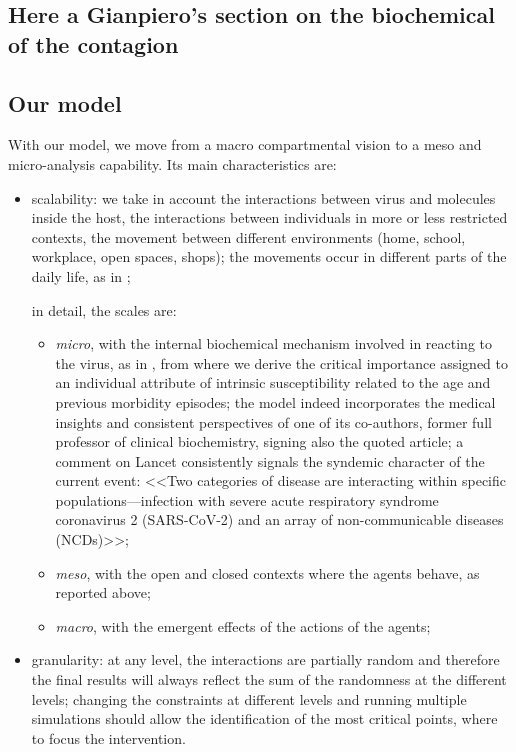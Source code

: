 \documentclass[graybox]{svmult}
\begin{document}
\subsection{Here a Gianpiero's section on the biochemical of the contagion}
\label{biochem}


\subsection{Our model}
\label{ourModel}

With our model, we move from a macro compartmental vision to a meso and micro-analysis capability. Its main characteristics are:

\begin{itemize}

\item
scalability: we take in account the interactions between virus and molecules inside the host, the interactions between individuals in more or less restricted contexts, the movement between different environments (home, school, workplace, open spaces, shops); the movements occur in different parts of the daily life, as in  \cite{ghorbani2020assocc};

in detail, the scales are: 

\begin{itemize}
\item
	\emph{micro}, with the internal biochemical mechanism involved in reacting to the virus, as in \cite{Silvagno_2020}, from where we derive the critical importance assigned to an individual attribute of intrinsic susceptibility related to the age and previous morbidity episodes; the model indeed incorporates the medical insights and consistent perspectives of one of its co-authors, former full professor of clinical biochemistry, signing also the quoted article; a comment on Lancet \cite{horton2020offline} consistently signals the syndemic character of the current event: <<Two categories of disease are interacting within specific populations---infection with severe acute respiratory syndrome coronavirus 2 (SARS-CoV-2) and an array of non-communicable diseases (NCDs)>>;
\item
	\emph{meso}, with the open and closed contexts where the agents behave, as reported above;
\item	
	\emph{macro}, with the emergent effects of the actions of the agents;
	
\end{itemize}

\item
granularity: at any level, the interactions are partially random and therefore the final results will always reflect the sum of the randomness at the different levels; changing the constraints at different levels and running multiple simulations should allow the identification of the most critical points, where to focus the intervention.

\end{itemize}
\end{document}
